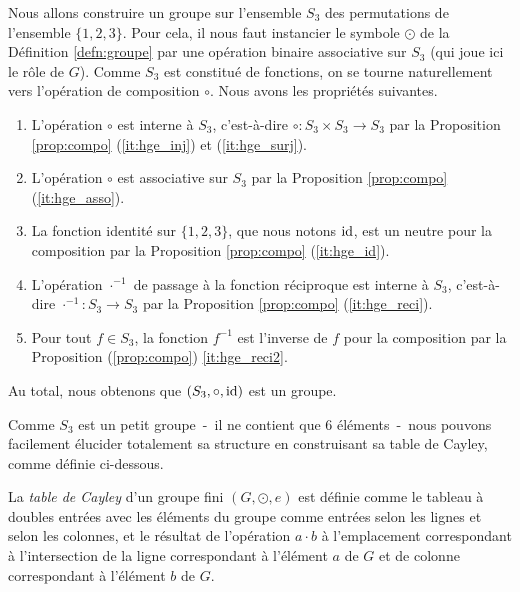 \documentclass[french,course,oneside,theoremnosection]{lecture}
\begin{document}
\begin{example}\label{ex:s3}
Nous allons construire un groupe sur l'ensemble $S_3$ des permutations de l'ensemble $\{1,2,3\}$. Pour cela, il nous faut instancier le symbole $\odot$ de la Définition \ref{defn:groupe} par une opération binaire associative sur $S_3$ (qui joue ici le rôle de $G$). Comme $S_3$ est constitué de fonctions, on se tourne naturellement vers l'opération de composition $\circ$. Nous avons les propriétés suivantes.
\begin{enumerate}
\item L'opération $\circ$ est interne à $S_3$, c'est-à-dire $\circ \colon S_3 \times S_3 \to S_3$ par la Proposition \ref{prop:compo} (\ref{it:hge_inj}) et (\ref{it:hge_surj}).
\item L'opération $\circ$ est associative sur $S_3$ par la Proposition \ref{prop:compo} (\ref{it:hge_asso}).
\item La fonction identité sur $\{1,2,3\}$, que nous notons $\operatorname{id}$, est un neutre pour la composition par la Proposition \ref{prop:compo} (\ref{it:hge_id}).
\item L'opération $\cdot^{-1}$ de passage à la fonction réciproque est interne à $S_3$, c'est-à-dire $\cdot^{-1}\colon S_3 \to S_3$ par la Proposition \ref{prop:compo} (\ref{it:hge_reci}).
\item Pour tout $f\in S_3$, la fonction $f^{-1}$ est l'inverse de $f$ pour la composition par la Proposition (\ref{prop:compo}) \ref{it:hge_reci2}.
\end{enumerate} 
Au total, nous obtenons que $(S_3, \circ, \operatorname{id})$ est un groupe. 
\end{example}
Comme $S_3$ est un petit groupe~-~il ne contient que 6 éléments~-~nous pouvons facilement élucider totalement sa structure en construisant sa table de Cayley, comme définie ci-dessous.
\begin{definition}
La \emph{table de Cayley} d'un groupe fini $(G, \odot,  e)$ est définie comme le tableau à doubles entrées avec les éléments du groupe comme entrées selon les lignes et selon les colonnes, et le résultat de l'opération $a\cdot b$ à l'emplacement correspondant à l'intersection de la ligne correspondant à l'élément $a$ de $G$ et de colonne correspondant à l'élément $b$ de $G$.  
\end{definition}
\end{document}
